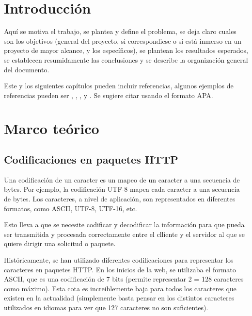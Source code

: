 \documentclass{prgrado}
\begin{document}
\chapter{Introducción}

Aquí se motiva el trabajo, se plantea y define el problema, se deja claro cuales son los objetivos (general del proyecto, si correspondiese o si está inmerso en un proyecto de mayor alcance, y los específicos), se plantean los resultados esperados, se establecen resumidamente las conclusiones y se describe la
organización general del documento.

Este y los siguientes capítulos pueden incluir referencias, algunos ejemplos de referencias pueden ser \cite{CitekeyArticle}, \cite{CitekeyBook}, \cite{CitekeyInproceedings}, \cite{CitekeyManual} y \cite{CitekeyMisc}. Se sugiere citar usando el formato APA.


\chapter{Marco teórico} 


\section{Codificaciones en paquetes HTTP}

Una codificación de un caracter es un mapeo de un caracter a una secuencia de bytes. Por ejemplo, la codificación UTF-8 mapea cada caracter a una secuencia de bytes. Los caracteres, a nivel de aplicación, son representados en diferentes formatos, como ASCII, UTF-8, UTF-16, etc.

Esto lleva a que se necesite codificar y decodificar la información para que pueda ser transmitida y procesada correctamente entre el clliente y el servidor al que se quiere dirigir una solicitud o paquete.

Históricamente, se han utilizado diferentes codificaciones para representar los caracteres en paquetes HTTP. En los inicios de la web, se utilizaba el formato ASCII, que es una codificación de 7 bits (permite representar 2 = 128 caracteres como máximo). Esta cota es increiblemente baja para todos los caracteres que existen en la actualidad (simplemente basta pensar en los distintos caracteres utilizados en idiomas para ver que 127 caracteres no son suficientes). 
\end{document}
